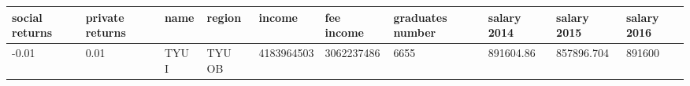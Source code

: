 \documentclass[11pt]{article}
\begin{document}
\begin{table}
    \centering
 \begin{tabular}{|l|l|l|l|l|l|l|l|l|l|}
 \hline
 social returns & private returns & name & region & income & fee income &  graduates number & salary 2014 & salary 2015 & salary 2016 \\ \hline
 -0.01 & 0.01 & TYU I & TYU OB & 4183964503 & 3062237486 & 6655 &  891604.86 & 857896.704 & 891600 \\ \hline
         \end{tabular}
\end{table}
\end{document}
